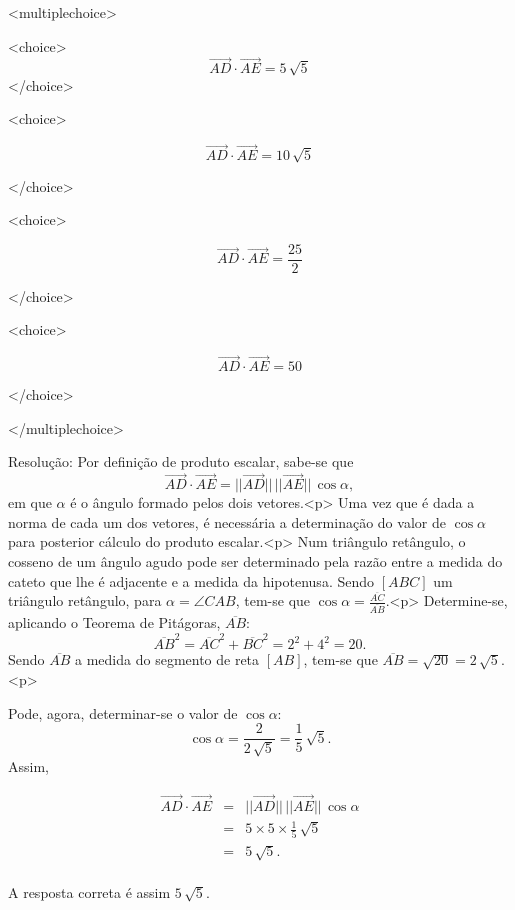 \documentclass{article}
\begin{document}
<multiplechoice>

<choice>
$$  \overrightarrow{AD} \cdot \overrightarrow{AE}=5 \, \sqrt{5}  $$
</choice>

<choice>

$$ \overrightarrow{AD} \cdot \overrightarrow{AE}=10 \, \sqrt{5} $$

</choice>

<choice>

$$ \overrightarrow{AD} \cdot \overrightarrow{AE}=\frac{25}{2} $$

</choice>

<choice>

$$ \overrightarrow{AD} \cdot \overrightarrow{AE}=50 $$

</choice>

</multiplechoice>


Resolução:
Por definição de produto escalar, sabe-se que
$$ \overrightarrow{AD} \cdot \overrightarrow{AE}=||\overrightarrow{AD}|| \, ||\overrightarrow{AE}|| \, \cos\alpha,$$
em que $\alpha$ é o ângulo formado pelos dois vetores.<p>
Uma vez que é dada a norma de cada um dos vetores, é necessária a determinação do valor de $\cos\alpha$ para posterior cálculo do produto escalar.<p>
Num triângulo retângulo, o cosseno de um ângulo agudo pode ser determinado pela razão entre a medida do cateto que lhe é adjacente e a medida da hipotenusa. Sendo $[ABC]$ um triângulo retângulo, para $\alpha=\angle CAB$, tem-se que $\displaystyle \cos \alpha =\frac{\overline{AC}}{\overline{AB}}$.<p> Determine-se, aplicando o Teorema de Pitágoras, $\overline{AB}$:
    $$\overline{AB}^2=\overline{AC}^2+\overline{BC}^2=2^2+4^2= 20.$$
Sendo $\overline{AB}$ a medida do segmento de reta $[AB]$, tem-se que $\overline{AB}=\sqrt{20}=2 \, \sqrt{5}$.<p>

Pode, agora, determinar-se o valor de $\cos\alpha$:
    $$\cos\alpha=\frac{2}{2 \, \sqrt{5}}=\frac{1}{5} \, \sqrt{5}.$$
Assim,


\begin{eqnarray*}
    \overrightarrow{AD} \cdot \overrightarrow{AE}&=& ||\overrightarrow{AD}|| \,||\overrightarrow{AE}|| \, \cos\alpha \\
                                           &=& 5 \times 5\times \frac{1}{5} \, \sqrt{5} \\
                                           &=& 5 \, \sqrt{5}. \\
\end{eqnarray*} 

A resposta correta é assim $\displaystyle 5 \, \sqrt{5}$.
\end{document}
